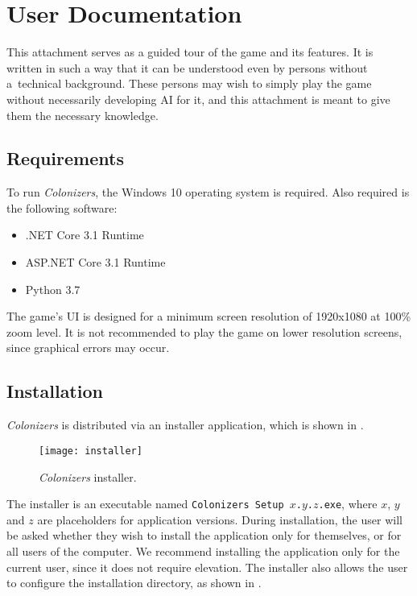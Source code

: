 \section{User Documentation}
\label{sec:userdocs}

This attachment serves as a guided tour of the game and its features.
It is written in such a way that it can be understood even by persons
without a~technical background. These persons may wish to simply
play the game without necessarily developing AI for it, and this attachment
is meant to give them the necessary knowledge.

\subsection{Requirements}

To run \emph{Colonizers}, the Windows 10 operating system is required.
Also required is the following software:
\begin{itemize}
    \item .NET Core 3.1 Runtime
    \item ASP.NET Core 3.1 Runtime
    \item Python 3.7
\end{itemize}
The game's UI is designed for a minimum screen resolution of 1920x1080 at
100\% zoom level. It is not recommended to play the game on lower resolution
screens, since graphical errors may occur.

\subsection{Installation}

\emph{Colonizers} is distributed via an installer application, which is shown
in .

\begin{figure}[ht]
\centerline{\mbox{\texttt{[image: installer]}}}
\caption{\emph{Colonizers} installer.}\label{ud:installer}
\end{figure}

The installer is an executable named \texttt{Colonizers Setup $x$.$y$.$z$.exe},
where $x$, $y$ and $z$ are placeholders for application versions. During installation,
the user will be asked whether they wish to install the application only for themselves,
or for all users of the computer. We recommend installing the application
only for the current user, since it does not require elevation. The installer
also allows the user to configure the installation directory,
as shown in .

